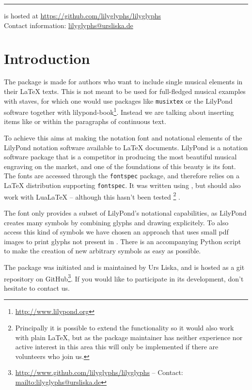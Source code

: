 \documentclass{article}
\begin{document}
\hrule
\bigskip
\noindent
\lilyglyphs is hosted at \url{https://github.com/lilyglyphs/lilyglyphs}\\
Contact information: \href{mailto:lilyglyphs@ursliska.de}{lilyglyphs@ursliska.de}
\pagebreak

\tableofcontents

\pagebreak
\section{Introduction}
\label{sec:introduction}
The package \lilyglyphs is made for authors who want to include single musical elements in their \LaTeX{} texts. 
This is not meant to be used for full-fledged musical examples with staves, for which one would use packages like \texttt{musixtex} or the LilyPond software together with lilypond-book\footnote{\url{http://www.lilypond.org}}. 
Instead we are talking about inserting items like \quaver or \lilyRFZ within the paragraphs of continuous text.

To achieve this \lilyglyphs aims at making the notation font and notational elements of the LilyPond notation software available to \LaTeX{} documents.
LilyPond is a notation software package that is a competitor in producing the most beautiful musical engraving on the market, and one of the foundations of this beauty is its \emmentaler font.
The \emmentaler fonts are accessed through the \texttt{fontspec} package, and \lilyglyphs therefore relies on a \LaTeX{} distribution supporting \texttt{fontspec}. 
It was written using \XeLaTeX, but should also work with LuaLaTeX -- although this hasn't been tested%
\footnote{Principally it is possible to extend the functionality so it would also work with plain \LaTeX, but as the package maintainer has neither experience nor active interest in this area this will only be implemented if there are volunteers who join us.}%
.

The \emmentaler font only provides a subset of LilyPond's notational capabilities, as LilyPond creates many symbols by combining glyphs and drawing explicitely.
To also access this kind of symbols we have chosen an approach that uses small pdf images to print glyphs not present in \emmentaler*.
There is an accompanying Python script to make the creation of new arbitrary symbols as easy as possible.

The \lilyglyphs package was initiated and is maintained by Urs Liska, and is hosted as a git repository on GitHub\footnote{\url{http://www.github.com/lilyglyphs/lilyglyphs} -- Contact: \url{mailto:lilyglyphs@ursliska.de}}.
If you would like to participate in its development, don't hesitate to contact us.
\end{document}
